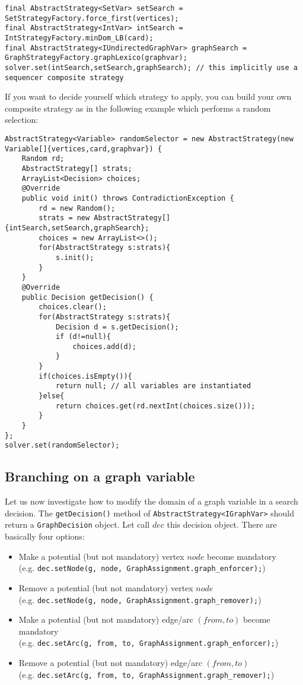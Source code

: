\documentclass{article}
\begin{document}
\begin{lstlisting}
final AbstractStrategy<SetVar> setSearch = SetStrategyFactory.force_first(vertices);
final AbstractStrategy<IntVar> intSearch = IntStrategyFactory.minDom_LB(card);
final AbstractStrategy<IUndirectedGraphVar> graphSearch = GraphStrategyFactory.graphLexico(graphvar);
solver.set(intSearch,setSearch,graphSearch); // this implicitly use a sequencer composite strategy
\end{lstlisting}

If you want to decide yourself which strategy to apply, you can build your own composite strategy as in the following example which performs a random selection:

\begin{lstlisting}
AbstractStrategy<Variable> randomSelector = new AbstractStrategy(new Variable[]{vertices,card,graphvar}) {
	Random rd;
	AbstractStrategy[] strats;
	ArrayList<Decision> choices;
	@Override
	public void init() throws ContradictionException {
		rd = new Random();
		strats = new AbstractStrategy[]{intSearch,setSearch,graphSearch};
		choices = new ArrayList<>();
		for(AbstractStrategy s:strats){
			s.init();
		}
	}
	@Override
	public Decision getDecision() {
		choices.clear();
		for(AbstractStrategy s:strats){
			Decision d = s.getDecision();
			if (d!=null){
				choices.add(d);
			}
		}
		if(choices.isEmpty()){
			return null; // all variables are instantiated
		}else{
			return choices.get(rd.nextInt(choices.size()));
		}
	}
};
solver.set(randomSelector);
\end{lstlisting}

\subsection{Branching on a graph variable}

Let us now investigate how to modify the domain of a graph variable in a search decision. 
The \texttt{getDecision()} method of \texttt{AbstractStrategy<IGraphVar>} should return a \texttt{GraphDecision} object. Let call $dec$ this decision object. 
There are basically four options:
\begin{itemize} 
\item Make a potential (but not mandatory) vertex $node$ become mandatory \\ 
(e.g. \texttt{dec.setNode(g, node, GraphAssignment.graph\_enforcer);})
\item Remove a potential (but not mandatory) vertex $node$ \\ 
(e.g. \texttt{dec.setNode(g, node, GraphAssignment.graph\_remover);})
\item Make a potential (but not mandatory) edge/arc $(from,to)$ become mandatory \\ 
(e.g. \texttt{dec.setArc(g, from, to, GraphAssignment.graph\_enforcer);})
\item Remove a potential (but not mandatory) edge/arc $(from,to)$ \\ 
(e.g. \texttt{dec.setArc(g, from, to, GraphAssignment.graph\_remover);})
\end{itemize}
\end{document}
